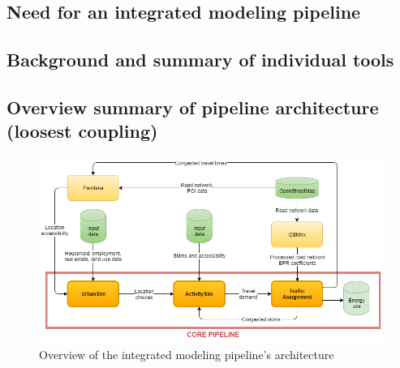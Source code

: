 \subsection{Need for an integrated modeling pipeline}




\subsection{Background and summary of individual tools}




\subsection{Overview summary of pipeline architecture (loosest coupling)}

\begin{figure}[ht]
\center
\includegraphics[width=\textwidth]
{graphics/diagram_pipeline.png}
\caption{Overview of the integrated modeling pipeline's architecture}
\label{fig:overview_pipeline_architecture}
\end{figure}




